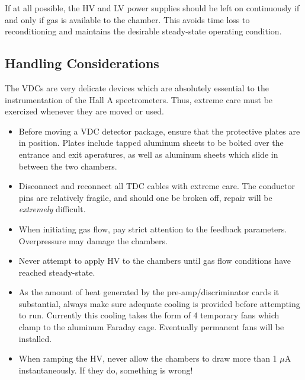 \documentclass[12pt]{article}
\begin{document}
If at all possible, the HV and LV power supplies should be left
on continuously if and only if gas is available to the chamber.  This
avoids time loss to reconditioning and maintains the desirable
steady-state operating condition.

\subsection{Handling Considerations}

The VDCs are very delicate devices which are absolutely essential to
the instrumentation of the Hall A spectrometers.  Thus, extreme care
must be exercized whenever they are moved or used.

\begin{itemize}
\item{Before moving a VDC detector package, ensure that the protective
plates are in position.  Plates include tapped aluminum sheets to
be bolted over the entrance and exit aperatures, as well as aluminum
sheets which slide in between the two chambers.}
\item{Disconnect and reconnect all TDC cables with extreme care.  The
conductor pins are relatively fragile, and should one be broken off,
repair will be {\it extremely} difficult.}
\item{When initiating gas flow, pay strict attention to the feedback
parameters.  Overpressure may damage the chambers.}
\item{Never attempt to apply HV to the chambers until gas flow
conditions have reached steady-state.}
\item{As the amount of heat generated by the pre-amp/discriminator
cards it substantial, always make sure adequate cooling is provided
before attempting to run.  Currently this cooling takes the form of
4 temporary fans which clamp to the aluminum Faraday cage.  Eventually
permanent fans will be installed.}
\item{When ramping the HV, never allow the chambers to draw more than
1 $\mu$A instantaneously.  If they do, something is wrong!}
\end{itemize}
\end{document}
